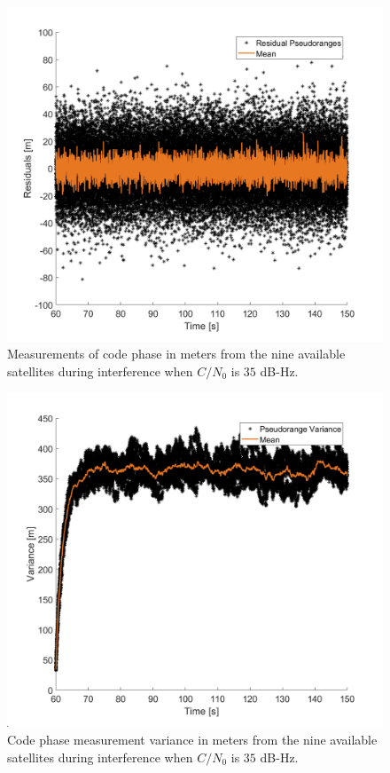 \documentclass[12pt]{report}
\begin{document}
\begin{figure}[!ht]
  \centering
  \includegraphics[width=0.75\linewidth]{Figures/Results/Scenario1/Case35/codephase.png}
  \caption{Measurements of code phase in meters from the nine available satellites during interference when \(C/N_0\) is \(35\) dB-Hz.}\label{fig:codephase35}
\end{figure}

\begin{figure}[!ht]
  \centering
  \includegraphics[width=0.75\linewidth]{Figures/Results/Scenario1/Case35/codeVariance.png}
  \caption{Code phase measurement variance in meters from the nine available satellites during interference when \(C/N_0\) is \(35\) dB-Hz.}\label{fig:codephaseVariance35}
\end{figure}
\end{document}
